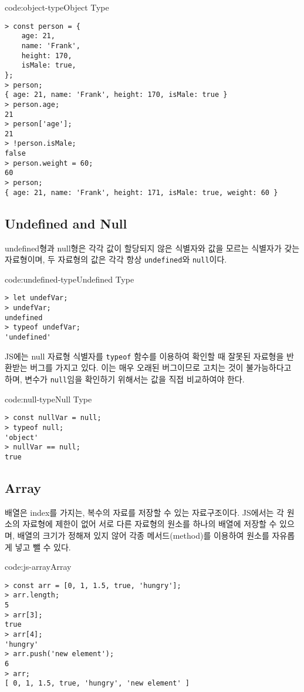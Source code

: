 \begin{codeenv}{code:object-type}{Object Type}\begin{verbatim}
> const person = {
    age: 21,
    name: 'Frank',
    height: 170,
    isMale: true,
};
> person;
{ age: 21, name: 'Frank', height: 170, isMale: true }
> person.age;
21
> person['age'];
21
> !person.isMale;
false
> person.weight = 60;
60
> person;
{ age: 21, name: 'Frank', height: 171, isMale: true, weight: 60 }
\end{verbatim}
\end{codeenv}

\subsection*{Undefined and Null}

undefined형과 null형은 각각 값이 할당되지 않은 식별자와 값을 모르는 식별자가 갖는 자료형이며, 두 자료형의 값은 각각 항상 \texttt{undefined}와 \texttt{null}이다.

\begin{codeenv}{code:undefined-type}{Undefined Type}\begin{verbatim}
> let undefVar;
> undefVar;
undefined
> typeof undefVar;
'undefined'
\end{verbatim}
\end{codeenv}

JS에는 null 자료형 식별자를 \texttt{typeof} 함수를 이용하여 확인할 때 잘못된 자료형을 반환받는 버그를 가지고 있다. 이는 매우 오래된 버그이므로 고치는 것이 불가능하다고 하며, 변수가 \texttt{null}임을 확인하기 위해서는 값을 직접 비교하여야 한다.
\newpage

\begin{codeenv}{code:null-type}{Null Type}\begin{verbatim}
> const nullVar = null;
> typeof null;
'object'
> nullVar == null;
true
\end{verbatim}
\end{codeenv}

\subsection*{Array}

배열은 index를 가지는, 복수의 자료를 저장할 수 있는 자료구조이다. JS에서는 각 원소의 자료형에 제한이 없어 서로 다른 자료형의 원소를 하나의 배열에 저장할 수 있으며, 배열의 크기가 정해져 있지 않어 각종 메서드(method)를 이용하여 원소를 자유롭게 넣고 뺄 수 있다.

\begin{codeenv}{code:js-array}{Array}\begin{verbatim}
> const arr = [0, 1, 1.5, true, 'hungry'];
> arr.length;
5
> arr[3];
true
> arr[4];
'hungry'
> arr.push('new element');
6
> arr;
[ 0, 1, 1.5, true, 'hungry', 'new element' ]
\end{verbatim}
\end{codeenv}
